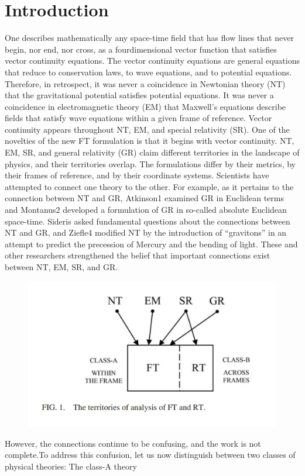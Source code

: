 \documentclass[12pt]{article}
\begin{document}
\section{Introduction}\label{sec:Intro}
One describes mathematically any space-time field that
has flow lines that never begin, nor end, nor cross, as a fourdimensional vector function that satisfies vector continuity
equations. The vector continuity equations are general equations that reduce to conservation laws,
to wave equations, and to potential equations. Therefore, in
retrospect, it was never a coincidence in Newtonian theory
(NT) that the gravitational potential satisfies potential equations. It was never a coincidence in electromagnetic theory
(EM) that Maxwell’s equations describe fields that satisfy
wave equations within a given frame of reference. Vector
continuity appears throughout NT, EM, and special relativity
(SR). One of the novelties of the new FT formulation is that
it begins with vector continuity.
NT, EM, SR, and general relativity (GR) claim different
territories in the landscape of physics, and their territories overlap. The formulations differ by their metrics, by their
frames of reference, and by their coordinate systems. Scientists have attempted to connect one theory to the other. For
example, as it pertains to the connection between NT and
GR, Atkinson1 examined GR in Euclidean terms and Montanus2 developed a formulation of GR in so-called absolute
Euclidean space-time. Sideris asked fundamental questions
about the connections between NT and GR, and Ziefle4 modified NT by the introduction of “gravitons” in an attempt to
predict the precession of Mercury and the bending of light.
These and other researchers strengthened the belief that
important connections exist between NT, EM, SR, and GR.
\begin{figure}[htbp]
    \includegraphics[width=0.6\linewidth]{1.jpg}
\end{figure}
However, the connections continue to be confusing, and the
work is not complete.To address this confusion, let us now distinguish
between two classes of physical theories: The class-A theory
\end{document}
